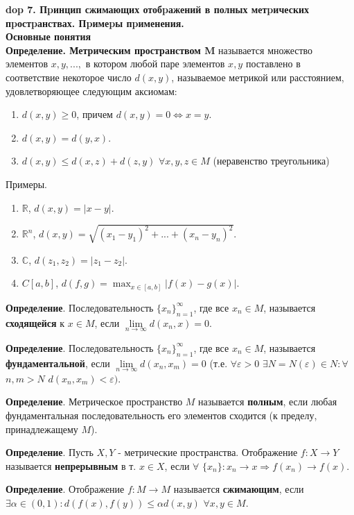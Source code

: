 \textbf{\LARGE dop 7. Пpинцип сжимающих отобpажений в полных метpических пpостpанствах. Пpимеpы пpименения.}  \\
\textbf{\large Основные понятия} \\
\textbf{Определение. Метрическим пространством M}
называется множество элементов $x, y, ...,$ в котором любой паре элементов $x, y$ поставлено в соответствие некоторое число $d(x, y)$, называемое метрикой или расстоянием, удовлетворяющее следующим аксиомам:
\begin{enumerate}
    \item $d(x, y) \geq 0$, причем $d(x, y)=0 \iff x=y$.
    \item $d(x, y) = d(y, x)$.
    \item $d(x, y) \leq d(x, z) + d(z, y)$ $\forall x,y,z \in M$ (неравенство треугольника)
\end{enumerate}

Примеры. 
\begin{enumerate}
    \item $\mathbb{R}$, $d(x,y)=|x-y|$.
    \item $\mathbb{R}^n$, $d(x, y) = \sqrt{(x_1-y_1)^2+...+(x_n-y_n)^2}$.
    \item $\mathbb{C}$, $d(z_1, z_2) = |z_1-z_2|$.
    \item $C[a,b]$, $d(f, g) = \max_{x \in [a,b]}|f(x)-g(x)|$. 
\end{enumerate}

\textbf{Определение}. Последовательность $\{x_n\}_{n=1}^{\infty}$, где все $x_n \in M$, называется \textbf{сходящейся} к $x \in M$, если $\lim\limits_{n \to \infty} d(x_n, x) = 0$.

\textbf{Определение}. Последовательность $\{x_n\}_{n=1}^{\infty}$, где все $x_n \in M$, называется \textbf{фундаментальной}, если $\lim\limits_{n \to \infty} d(x_n, x_m) = 0$ (т.е. $\forall \varepsilon > 0$ $\exists N = N(\varepsilon) \in N: \forall$ $n,m > N$ $d(x_n, x_m) < \varepsilon)$. 

\textbf{Определение}. Метрическое пространство $M$ называется \textbf{полным}, если любая фундаментальная последовательность его элементов сходится (к пределу, принадлежащему $M$).

\textbf{Определение}. Пусть $X, Y$ - метрические пространства. Отображение $f : X \xrightarrow{} Y$ называется
\textbf{непрерывным} в т. $x \in X$, если $\forall$ $ \{x_n\}:x_n \rightarrow x \Rightarrow f(x_n) \xrightarrow{} f(x)$. 

\textbf{Определение}. Отображение $f : M \xrightarrow{} M$ называется
\textbf{сжимающим}, если $\exists \alpha \in (0,1): d(f(x), f(y)) \leq \alpha d(x,y)$ $\forall x,y \in M$.

